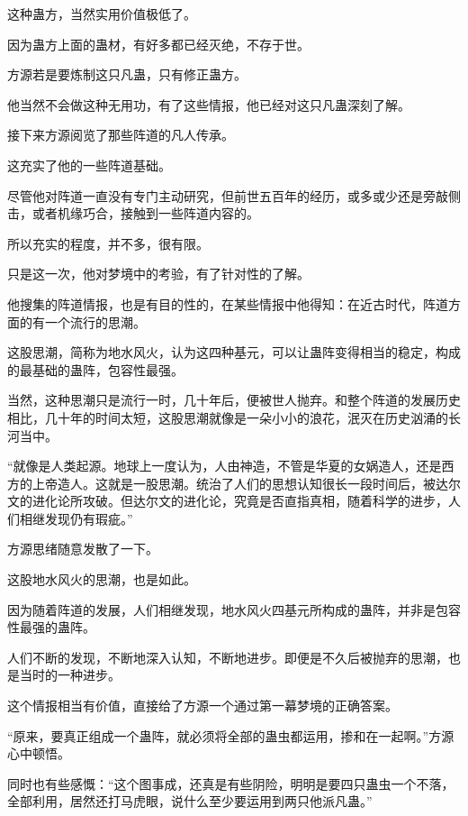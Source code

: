 
\begin{this_body}



这种蛊方，当然实用价值极低了。

因为蛊方上面的蛊材，有好多都已经灭绝，不存于世。

方源若是要炼制这只凡蛊，只有修正蛊方。

他当然不会做这种无用功，有了这些情报，他已经对这只凡蛊深刻了解。

接下来方源阅览了那些阵道的凡人传承。

这充实了他的一些阵道基础。

尽管他对阵道一直没有专门主动研究，但前世五百年的经历，或多或少还是旁敲侧击，或者机缘巧合，接触到一些阵道内容的。

所以充实的程度，并不多，很有限。

只是这一次，他对梦境中的考验，有了针对性的了解。

他搜集的阵道情报，也是有目的性的，在某些情报中他得知：在近古时代，阵道方面的有一个流行的思潮。

这股思潮，简称为地水风火，认为这四种基元，可以让蛊阵变得相当的稳定，构成的最基础的蛊阵，包容性最强。

当然，这种思潮只是流行一时，几十年后，便被世人抛弃。和整个阵道的发展历史相比，几十年的时间太短，这股思潮就像是一朵小小的浪花，泯灭在历史汹涌的长河当中。

“就像是人类起源。地球上一度认为，人由神造，不管是华夏的女娲造人，还是西方的上帝造人。这就是一股思潮。统治了人们的思想认知很长一段时间后，被达尔文的进化论所攻破。但达尔文的进化论，究竟是否直指真相，随着科学的进步，人们相继发现仍有瑕疵。”

方源思绪随意发散了一下。

这股地水风火的思潮，也是如此。

因为随着阵道的发展，人们相继发现，地水风火四基元所构成的蛊阵，并非是包容性最强的蛊阵。

人们不断的发现，不断地深入认知，不断地进步。即便是不久后被抛弃的思潮，也是当时的一种进步。

这个情报相当有价值，直接给了方源一个通过第一幕梦境的正确答案。

“原来，要真正组成一个蛊阵，就必须将全部的蛊虫都运用，掺和在一起啊。”方源心中顿悟。

同时也有些感慨：“这个图事成，还真是有些阴险，明明是要四只蛊虫一个不落，全部利用，居然还打马虎眼，说什么至少要运用到两只他派凡蛊。”


\end{this_body}
